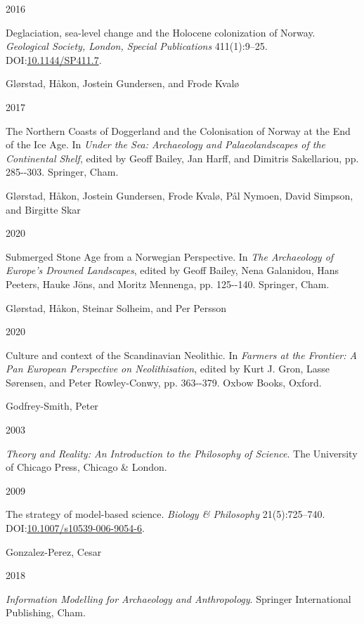 \documentclass[
  12pt,
  a4paper,
  oneside]{book}
\newlength{\cslhangindent}
\newlength{\csllabelwidth}
\newlength{\cslentryspacingunit} %
\newenvironment{CSLReferences}[2] %
 {%
  \setlength{\parindent}{0pt}
  \ifodd #1
  \let\oldpar\par
  \def\par{\hangindent=\cslhangindent\oldpar}
  \fi
  \setlength{\parskip}{#2\cslentryspacingunit}
 }%
 {}
\newcommand{\CSLBlock}[1]{#1\hfill\break}
\newcommand{\CSLLeftMargin}[1]{\parbox[t]{\csllabelwidth}{#1}}
\newcommand{\CSLRightInline}[1]{\parbox[t]{\linewidth - \csllabelwidth}{#1}\break}
\begin{document}
\begin{CSLReferences}{0}{0}
\leavevmode{}%
\CSLLeftMargin{ 2016 }%
\CSLRightInline{Deglaciation, sea-level change and the Holocene colonization of Norway. \emph{Geological Society, London, Special Publications} 411(1):9--25. DOI:\href{https://doi.org/10.1144/SP411.7}{10.1144/SP411.7}.}

\leavevmode{}%
\CSLBlock{Glørstad, Håkon, Jostein Gundersen, and Frode Kvalø}
\CSLLeftMargin{ 2017}%
\CSLRightInline{{The Northern Coasts of Doggerland and the Colonisation of Norway at the End of the Ice Age}. In \emph{{Under the Sea: Archaeology and Palaeolandscapes of the Continental Shelf}}, edited by Geoff Bailey, Jan Harff, and Dimitris Sakellariou, pp. 285-\/-303. Springer, Cham.}

\leavevmode{}%
\CSLBlock{Glørstad, Håkon, Jostein Gundersen, Frode Kvalø, Pål Nymoen, David Simpson, and Birgitte Skar}
\CSLLeftMargin{ 2020}%
\CSLRightInline{{Submerged Stone Age from a Norwegian Perspective}. In \emph{{The Archaeology of Europe's Drowned Landscapes}}, edited by Geoff Bailey, Nena Galanidou, Hans Peeters, Hauke Jöns, and Moritz Mennenga, pp. 125-\/-140. Springer, Cham.}

\leavevmode{}%
\CSLBlock{Glørstad, Håkon, Steinar Solheim, and Per Persson}
\CSLLeftMargin{ 2020}%
\CSLRightInline{{Culture and context of the Scandinavian Neolithic}. In \emph{{Farmers at the Frontier: A Pan European Perspective on Neolithisation}}, edited by Kurt J. Gron, Lasse Sørensen, and Peter Rowley-Conwy, pp. 363-\/-379. Oxbow Books, Oxford.}

\leavevmode{}%
\CSLBlock{Godfrey-Smith, Peter}
\CSLLeftMargin{ 2003}%
\CSLRightInline{\emph{{Theory and Reality: An Introduction to the Philosophy of Science}}. The University of Chicago Press, Chicago \& London.}

\leavevmode{}%
\CSLLeftMargin{ 2009 }%
\CSLRightInline{The strategy of model-based science. \emph{Biology \& Philosophy} 21(5):725--740. DOI:\href{https://doi.org/10.1007/s10539-006-9054-6}{10.1007/s10539-006-9054-6}.}

\leavevmode{}%
\CSLBlock{Gonzalez-Perez, Cesar}
\CSLLeftMargin{ 2018}%
\CSLRightInline{\emph{{Information Modelling for Archaeology and Anthropology}}. Springer International Publishing, Cham.}


\end{CSLReferences}
\end{document}
